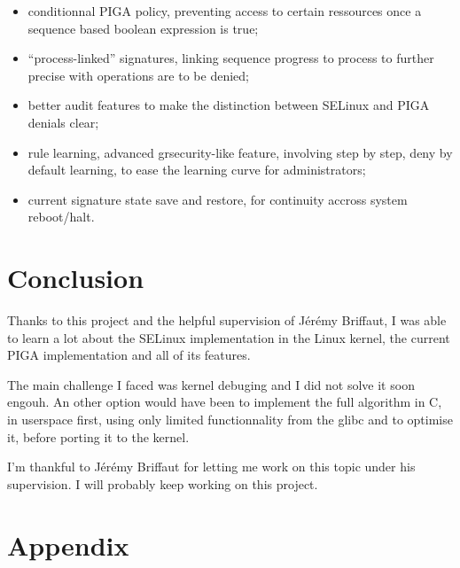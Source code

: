 \documentclass[pdftex,a4paper,titlepage,11pt]{article}
\begin{document}
\begin{itemize}
	\item conditionnal PIGA policy, preventing access to certain ressources
once a sequence based boolean expression is true;
	\item ``process-linked'' signatures, linking sequence progress to process
to further precise with operations are to be denied;
	\item better audit features to make the distinction between SELinux and PIGA
denials clear;
	\item rule learning, advanced grsecurity-like feature, involving step by
step, deny by default learning, to ease the learning curve for administrators;
	\item current signature state save and restore, for continuity accross
system reboot/halt.
\end{itemize}

\newpage

\section*{Conclusion} 

Thanks to this project and the helpful supervision of Jérémy Briffaut, I was
able to learn a lot about the SELinux implementation in the Linux kernel, the
current PIGA implementation and all of its features.

\bigskip

The main challenge I faced was kernel debuging and I did not solve it soon
engouh. An other option would have been to implement the full algorithm in C, in
userspace first, using only limited functionnality from the glibc and to
optimise it, before porting it to the kernel.

\bigskip

I'm thankful to Jérémy Briffaut for letting me work on this topic under his
supervision. I will probably keep working on this project.


\newpage


{}


\nocite{*}

\newpage

\section*{Appendix} 
\end{document}
